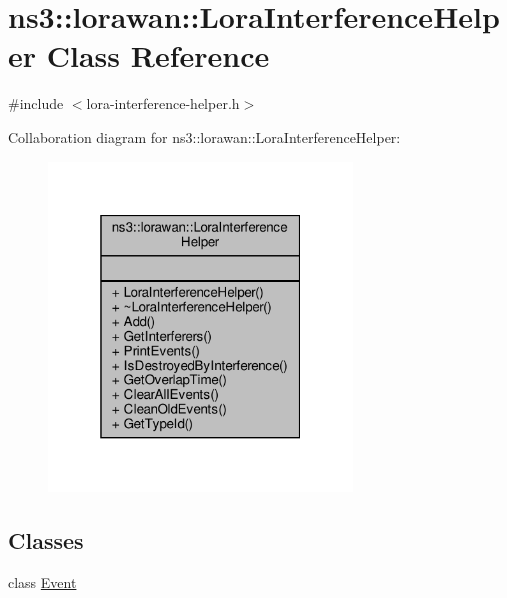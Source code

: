\hypertarget{classns3_1_1lorawan_1_1LoraInterferenceHelper}{}\section{ns3\+:\+:lorawan\+:\+:Lora\+Interference\+Helper Class Reference}
\label{classns3_1_1lorawan_1_1LoraInterferenceHelper}


{\ttfamily \#include $<$lora-\/interference-\/helper.\+h$>$}



Collaboration diagram for ns3\+:\+:lorawan\+:\+:Lora\+Interference\+Helper\+:
\nopagebreak
\begin{figure}[H]
\begin{center}
\leavevmode
\includegraphics[width=229pt]{classns3_1_1lorawan_1_1LoraInterferenceHelper__coll__graph}
\end{center}
\end{figure}
\subsection*{Classes}
\begin{DoxyCompactItemize}
\item 
class \hyperlink{classns3_1_1lorawan_1_1LoraInterferenceHelper_1_1Event}{Event}
\end{DoxyCompactItemize}
